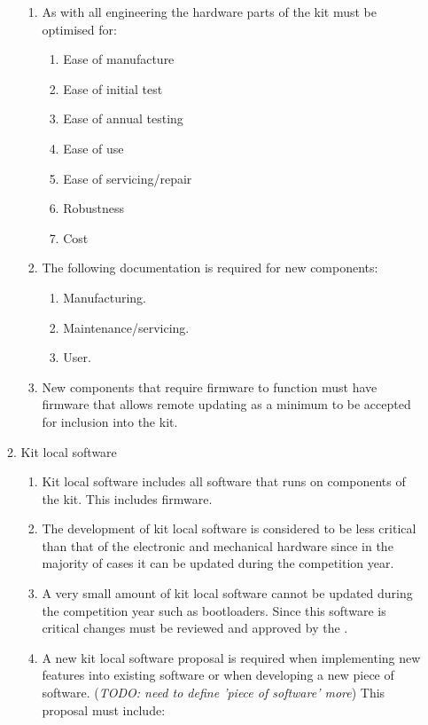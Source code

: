 \begin{enumerate}
\begin{enumerate}
\begin{enumerate}
        \item As with all engineering the hardware parts of the kit must be optimised for:
          \begin{enumerate}
            \item Ease of manufacture
            \item Ease of initial test
            \item Ease of annual testing
            \item Ease of use
            \item Ease of servicing/repair
            \item Robustness
            \item Cost
          \end{enumerate}
        \item The following documentation is required for new components:
          \begin{enumerate}
            \item Manufacturing.
            \item Maintenance/servicing.
            \item User.
          \end{enumerate}
        \item New components that require firmware to function must have firmware that allows remote updating as a minimum to be accepted for inclusion into the kit.
      \end{enumerate}
    \item Kit local software
      \begin{enumerate}
        \item Kit local software includes all software that runs on components of the kit. This includes firmware.
        \item The development of kit local software is considered to be less critical than that of the electronic and mechanical hardware since in the majority of cases it can be updated during the competition year.
        \item A very small amount of kit local software cannot be updated during the competition year such as bootloaders. Since this software is critical changes must be reviewed and approved by the .
        \item A new kit local software proposal is required when implementing new features into existing software or when developing a new piece of software. (\emph{TODO: need to define 'piece of software' more}) This proposal must include:

\end{enumerate}
\end{enumerate}
\end{enumerate}
